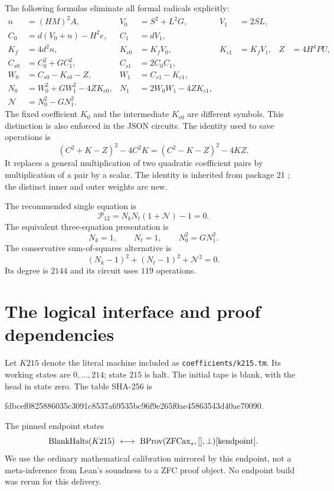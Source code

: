 \documentclass[11pt,a4paper]{article}
\theoremstyle{remark}\newtheorem{remark}[theorem]{Remark}
\newcommand{\ZFC}{\mathrm{ZFC}}
\begin{document}
The following formulas eliminate all formal radicals explicitly:
\begin{align*}
 n&=(HM)^2A,&V_0&=S^2+L^2G,&V_1&=2SL,\\
 C_0&=d(V_0+n)-H^2e,& C_1&=dV_1,\\
 K_f&=4d^2n,&K_{c0}&=K_fV_0,&K_{c1}&=K_fV_1,&Z&=4H^4PU,\\
 C_{s0}&=C_0^2+GC_1^2,&C_{s1}&=2C_0C_1,\\
 W_0&=C_{s0}-K_{c0}-Z,&W_1&=C_{s1}-K_{c1},\\
 N_0&=W_0^2+GW_1^2-4ZK_{c0},&
 N_1&=2W_0W_1-4ZK_{c1},\\
 \mathcal N&=N_0^2-GN_1^2.
\end{align*}
The fixed coefficient $K_0$ and the intermediate $K_{c0}$ are different
symbols. This distinction is also enforced in the JSON circuits.
The identity used to save operations is
\[
 (C^2+K-Z)^2-4C^2K=(C^2-K-Z)^2-4KZ.
\]
It replaces a general multiplication of two quadratic coefficient pairs
by multiplication of a pair by a scalar. The identity is inherited from
package 21 \cite{norm21}; the distinct inner and outer weights are new.

The recommended single equation is
\begin{equation}
 \boxed{\mathcal P_{12}=N_kN_t(1+\mathcal N)-1=0.}
 \label{eq:main}
\end{equation}
The equivalent three-equation presentation is
\begin{equation}
 \boxed{N_k=1,\qquad N_t=1,\qquad N_0^2=GN_1^2.}
 \label{eq:system}
\end{equation}
The conservative sum-of-squares alternative is
\begin{equation}
 (N_k-1)^2+(N_t-1)^2+\mathcal N^2=0.
 \label{eq:sos}
\end{equation}
Its degree is $2144$ and its circuit uses $119$ operations.

\section{The logical interface and proof dependencies}
\label{sec:dependencies}

Let $K215$ denote the literal machine included as
\texttt{coefficients/k215.tm}. Its working states are $0,\ldots,214$;
state $215$ is halt. The initial tape is blank, with the head in state zero.
The table SHA-256 is
\begin{center}\small\ttfamily
fdbcef0825886035c3091c8537a69535bc96f9e265f0ae45863543d40ae70090.
\end{center}
The pinned endpoint states
\[
 \operatorname{BlankHalts}(K215)
 \ \longleftrightarrow\
 \operatorname{BProv}(\ZFC\mathrm{ax}_s,[],\bot)
 \cite{kendpoint}.
\]
We use the ordinary mathematical calibration mirrored by this endpoint,
not a meta-inference from Lean's soundness to a ZFC proof object.
No endpoint build was rerun for this delivery.
\end{document}

